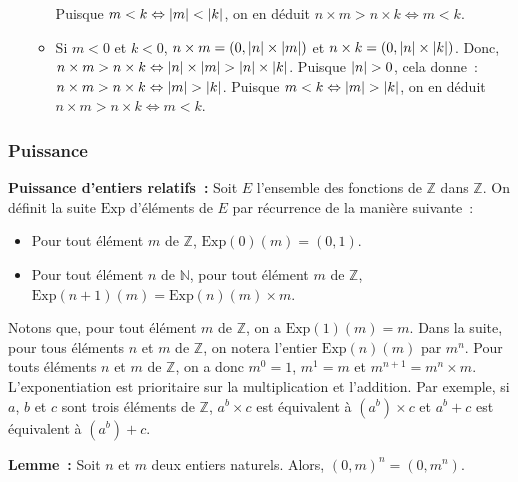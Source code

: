 \begin{itemize}[nosep]
\begin{itemize}[nosep]
                    Puisque $m < k \Leftrightarrow \left\lvert m \right\rvert < \left\lvert k \right\rvert$, on en déduit $n \times m > n \times k \Leftrightarrow m < k$.
                \item Si $m < 0$ et $k < 0$, $n \times m = (0, \left\lvert n \right\rvert \times \left\lvert m \right\rvert)$ et $n \times k = (0, \left\lvert n \right\rvert \times \left\lvert k \right\rvert)$.
                    Donc, $n \times m > n \times k \Leftrightarrow \left\lvert n \right\rvert \times \left\lvert m \right\rvert > \left\lvert n \right\rvert \times \left\lvert k \right\rvert$.
                    Puisque $\left\lvert n \right\rvert > 0$, cela donne : $n \times m > n \times k \Leftrightarrow \left\lvert m \right\rvert > \left\lvert k \right\rvert$. 
                    Puisque $m < k \Leftrightarrow \left\lvert m \right\rvert > \left\lvert k \right\rvert$, on en déduit $n \times m > n \times k \Leftrightarrow m < k$.
            \end{itemize}
    \end{itemize}

    \done

\subsubsection{Puissance}

\noindent\textbf{Puissance d'entiers relatifs :} Soit $E$ l'ensemble des fonctions de $\mathbb{Z}$ dans $\mathbb{Z}$. 
    On définit la suite $\mathrm{Exp}$ d'éléments de $E$ par récurrence de la manière suivante : 
    \begin{itemize}[nosep]
        \item Pour tout élément $m$ de $\mathbb{Z}$, $\mathrm{Exp}(0)(m) = (0,1)$.
        \item Pour tout élément $n$ de $\mathbb{N}$, pour tout élément $m$ de $\mathbb{Z}$, $\mathrm{Exp}(n+1)(m) = \mathrm{Exp}(n)(m) \times m$.
    \end{itemize}
    Notons que, pour tout élément $m$ de $\mathbb{Z}$, on a $\mathrm{Exp}(1)(m) = m$. 
    Dans la suite, pour tous éléments $n$ et $m$ de $\mathbb{Z}$, on notera l'entier $\mathrm{Exp}(n)(m)$ par $m^n$. 
    Pour touts éléments $n$ et $m$ de $\mathbb{Z}$, on a donc $m^0=1$, $m^1 = m$ et $m^{n+1} = m^n \times m$. 
    L'exponentiation est prioritaire sur la multiplication et l'addition. 
    Par exemple, si $a$, $b$ et $c$ sont trois éléments de $\mathbb{Z}$, $a^b \times c$ est équivalent à $(a^b) \times c$ et $a^b + c$ est équivalent à $(a^b) + c$.

\medskip

\noindent\textbf{Lemme :} Soit $n$ et $m$ deux entiers naturels. 
    Alors, $(0,m)^n = (0,m^n)$.

\medskip

